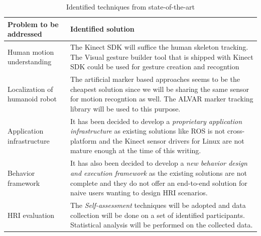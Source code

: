 \begin{table}[H]
\centering
\small
\caption{Identified techniques from state-of-the-art}
\label{table:review_decisions}
\begin{tabular}{ | l | p{10cm} |}
\hline
  \textbf{Problem to be addressed} & \textbf{Identified solution}
  \tabularnewline \hline
  
  Human motion understanding & The Kinect SDK \cite{KinectSDK2014} will suffice the human skeleton tracking. The Visual gesture builder tool that is shipped with Kinect SDK could be used for gesture creation and recogntion
                                          \tabularnewline\hline
                                          
  Localization of humanoid robot & The artificial marker based approaches seems to be the cheapest solution since we will be sharing the same sensor for motion recogntion as well. The ALVAR marker tracking library \cite{ALVAR} will be used to this purpose. 
                                          \tabularnewline\hline
  
  Application infrastructure & It has been decided to develop a \emph{proprietary application infrastructure} as existing solutions like ROS \cite{quigley2009ros} is not cross-platform and the Kinect sensor drivers for Linux are not mature enough at the time of this writing.
                                          \tabularnewline\hline

  Behavior framework & It has also been decided to develop a \emph{new behavior design and execution framework} as the existing solutions are not complete and they do not offer an end-to-end solution for naive users wanting to design HRI scenarios.
                                          \tabularnewline\hline

  HRI evaluation & The \emph{Self-assessment} techniques will be adopted and data collection will be done on a set of identified participants. Statistical analysis will be performed on the collected data.
                                          \tabularnewline\hline
\end{tabular}
\end{table}